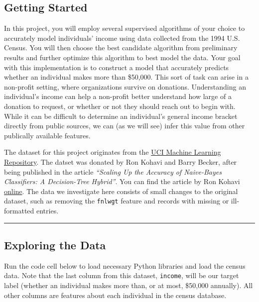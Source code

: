 \documentclass[11pt]{article}
\begin{document}
    \hypertarget{getting-started}{%
\subsection{Getting Started}\label{getting-started}}

In this project, you will employ several supervised algorithms of your
choice to accurately model individuals' income using data collected from
the 1994 U.S. Census. You will then choose the best candidate algorithm
from preliminary results and further optimize this algorithm to best
model the data. Your goal with this implementation is to construct a
model that accurately predicts whether an individual makes more than
\$50,000. This sort of task can arise in a non-profit setting, where
organizations survive on donations. Understanding an individual's income
can help a non-profit better understand how large of a donation to
request, or whether or not they should reach out to begin with. While it
can be difficult to determine an individual's general income bracket
directly from public sources, we can (as we will see) infer this value
from other publically available features.

The dataset for this project originates from the
\href{https://archive.ics.uci.edu/ml/datasets/Census+Income}{UCI Machine
Learning Repository}. The datset was donated by Ron Kohavi and Barry
Becker, after being published in the article \emph{``Scaling Up the
Accuracy of Naive-Bayes Classifiers: A Decision-Tree Hybrid''}. You can
find the article by Ron Kohavi
\href{https://www.aaai.org/Papers/KDD/1996/KDD96-033.pdf}{online}. The
data we investigate here consists of small changes to the original
dataset, such as removing the
\texttt{\textquotesingle{}fnlwgt\textquotesingle{}} feature and records
with missing or ill-formatted entries.

    \begin{center}\rule{0.5\linewidth}{\linethickness}\end{center}

\hypertarget{exploring-the-data}{%
\subsection{Exploring the Data}\label{exploring-the-data}}

Run the code cell below to load necessary Python libraries and load the
census data. Note that the last column from this dataset,
\texttt{\textquotesingle{}income\textquotesingle{}}, will be our target
label (whether an individual makes more than, or at most, \$50,000
annually). All other columns are features about each individual in the
census database.
\end{document}
